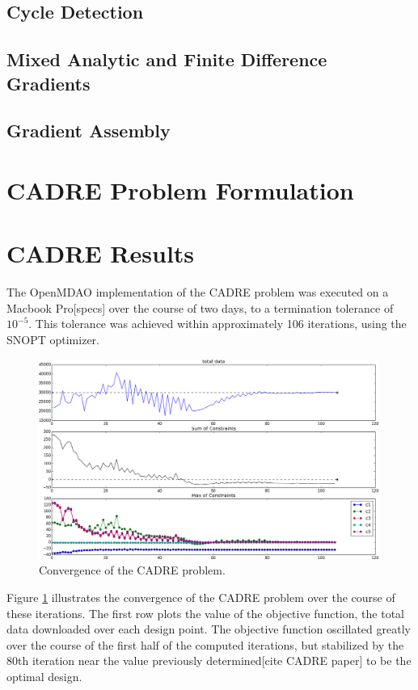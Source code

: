 \documentclass[]{aiaa-tc} %
\begin{document}
    \subsection{Cycle Detection}
    \subsection{Mixed Analytic and Finite Difference Gradients}
    \subsection{Gradient Assembly}

  \section{CADRE Problem Formulation}

  \section{CADRE Results}

The OpenMDAO implementation of the CADRE problem was executed on a Macbook Pro[specs]
over the course of two days, to a termination tolerance of $10^{-5}$. This tolerance
was achieved within approximately 106 iterations, using the SNOPT\cite{gill2005snopt}
optimizer.

\begin{figure}
\centering
\includegraphics[width=0.99\textwidth]{images/opt.png}
\caption[width=0.22\textwidth]{Convergence of the CADRE problem.}
\label{convergence}
\end{figure}


Figure \ref{convergence} illustrates the convergence of the CADRE problem over the course of
these iterations. The first row plots the
value of the objective function, the total data downloaded over each design point. The objective
function oscillated greatly over the course of the first half of the computed iterations, but
stabilized by the 80th iteration near the value previously determined[cite CADRE paper]
to be the optimal design.
\end{document}

